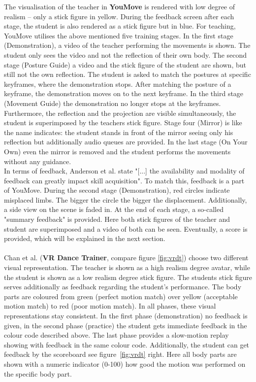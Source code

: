 The visualisation of the teacher in \textbf{YouMove} \cite{Anderson2013a} is rendered with low degree of realism \--- only a stick figure in yellow. During the feedback screen after each stage, the student is also rendered as a stick figure but in blue. For teaching, YouMove utilises the above mentioned five training stages. In the first stage (Demonstration), a video of the teacher performing the movements is shown. The student only sees the video and not the reflection of their own body. The second stage (Posture Guide) a video and the stick figure of the student are shown, but still not the own reflection. The student is asked to match the postures at specific keyframes, where the demonstration stops. After matching the posture of a keyframe, the demonstration moves on to the next keyframe. In the third stage (Movement Guide) the demonstration no longer stops at the keyframes. Furthermore, the reflection and the projection are visible simultaneously, the student is superimposed by the teachers stick figure. Stage four (Mirror) is like the name indicates: the student stands in front of the mirror seeing only his reflection but additionally audio queues are provided. In the last stage (On Your Own) even the mirror is removed and the student performs the movements without any guidance.\\
In terms of feedback, Anderson et al. state "[...] the availability and modality of feedback can greatly impact skill acquisition". To match this, feedback is a part of YouMove. During the second stage (Demonstration), red circles indicate misplaced limbs. The bigger the circle the bigger the displacement. Additionally, a side view on the scene is faded in. At the end of each stage, a so-called "summary feedback" is provided. Here both stick figures of the teacher and student are superimposed and a video of both can be seen. Eventually, a score is provided, which will be explained in the next section.\\ \\
Chan et al. (\textbf{VR Dance Trainer}\cite{Chan2010}, compare figure \ref{fig:vrdt}) choose two different visual representation. The teacher is shown as a high realism degree avatar, while the student is shown as a low realism degree stick figure. The students stick figure serves additionally as feedback regarding the student's performance. The body parts are coloured from green (perfect motion match) over yellow (acceptable motion match) to red (poor motion match). In all phases, these visual representations stay consistent. In the first phase (demonstration) no feedback is given, in the second phase (practice) the student gets immediate feedback in the colour code described above. The last phase provides a slow-motion replay showing with feedback in the same colour code. Additionally, the student can get feedback by the scoreboard see figure~\ref{fig:vrdt} right. Here all body parts are shown with a numeric indicator (0-100) how good the motion was performed on the specific body part.
